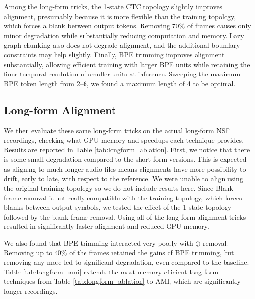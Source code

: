 Among the long-form tricks, the 1-state CTC topology slightly improves alignment, presumably because it is more flexible than the training topology, which forces a blank between output tokens. Removing 70\% of frames causes only minor degradation while substantially reducing computation and memory. Lazy graph chunking also does not degrade alignment, and the additional boundary constraints may help slightly. Finally, BPE trimming improves alignment substantially, allowing efficient training with larger BPE units while retaining the finer temporal resolution of smaller units at inference. Sweeping the maximum BPE token length from 2--6, we found a maximum length of 4 to be optimal.


\vspace{-3mm}
\subsection{Long-form Alignment}
\label{sec:results_longform}
We then evaluate these same long-form tricks on the actual long-form NSF recordings, checking what GPU memory and speedups each technique provides. Results are reported in Table \ref{tab:longform_ablation}. First, we notice that there is some small degradation compared to the short-form versions. This is expected as aligning to much longer audio files means alignments have more possibility to drift, early to late, with respect to the reference. We were unable to align using the original training topology so we do not include results here. Since Blank-frame removal is not really compatible with the training topology, which forces blanks between output symbols, we tested the effect of the 1-state topology followed by the blank frame removal. Using all of the long-form alignment tricks resulted in significantly faster alignment and reduced GPU memory.

We also found that BPE trimming interacted very poorly with $\oslash$-removal. Removing up to 40\% of the frames retained the gains of BPE trimming, but removing any more led to significant degradation, even compared to the baseline. Table \ref{tab:longform_ami} extends the most memory efficient long form techniques from Table \ref{tab:longform_ablation} to AMI, which are significantly longer recordings.    


\vspace{-2mm}
